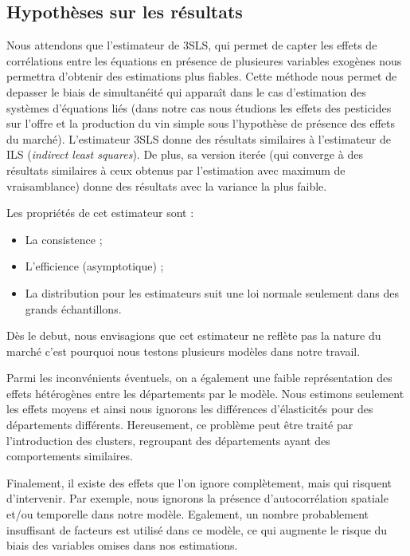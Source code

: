 \documentclass[11pt,]{article}
\providecommand{\tightlist}{%
  \setlength{\itemsep}{0pt}\setlength{\parskip}{0pt}}
\begin{document}
\hypertarget{hypotheses-sur-les-resultats}{%
\subsection{Hypothèses sur les
résultats}\label{hypotheses-sur-les-resultats}}

Nous attendons que l'estimateur de 3SLS, qui permet de capter les effets
de corrélations entre les équations en présence de plusieures variables
exogènes nous permettra d'obtenir des estimations plus fiables. Cette
méthode nous permet de depasser le biais de simultanéité qui apparaît
dans le cas d'estimation des systèmes d'équations liés (dans notre cas
nous étudions les effets des pesticides sur l'offre et la production du
vin simple sous l'hypothèse de présence des effets du marché).
L'estimateur 3SLS donne des résultats similaires à l'estimateur de ILS
(\emph{indirect least squares}). De plus, sa version iterée (qui
converge à des résultats similaires à ceux obtenus par l'estimation avec
maximum de vraisamblance) donne des résultats avec la variance la plus
faible.

Les propriétés de cet estimateur sont :

\begin{itemize}
\tightlist
\item
  La consistence ;
\item
  L'efficience (asymptotique) ;
\item
  La distribution pour les estimateurs suit une loi normale seulement
  dans des grands échantillons.
\end{itemize}

Dès le debut, nous envisagions que cet estimateur ne reflète pas la
nature du marché c'est pourquoi nous testons plusieurs modèles dans
notre travail.

Parmi les inconvénients éventuels, on a également une faible
représentation des effets hétérogènes entre les départements par le
modèle. Nous estimons seulement les effets moyens et ainsi nous ignorons
les différences d'élasticités pour des départements différents.
Hereusement, ce problème peut être traité par l'introduction des
clusters, regroupant des départements ayant des comportements
similaires.

Finalement, il existe des effets que l'on ignore complètement, mais qui
risquent d'intervenir. Par exemple, nous ignorons la présence
d'autocorrélation spatiale et/ou temporelle dans notre modèle.
Egalement, un nombre probablement insuffisant de facteurs est utilisé
dans ce modèle, ce qui augmente le risque du biais des variables omises
dans nos estimations.
\end{document}
